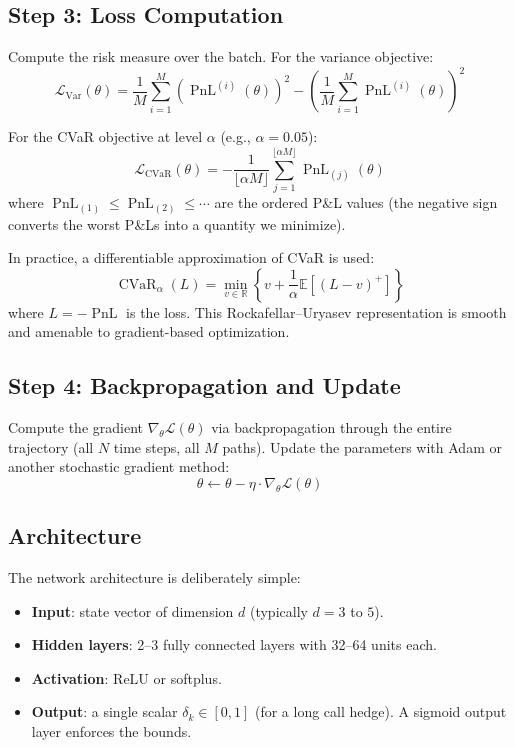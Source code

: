 \documentclass[11pt, a4paper]{article}
\theoremstyle{definition}
\theoremstyle{plain}
\theoremstyle{remark}
\newcommand{\CVaR}{\operatorname{CVaR}}
\newcommand{\EV}{\mathbb{E}}
\newcommand{\RV}{\mathbb{R}}
\newcommand{\PnL}{\operatorname{PnL}}
\begin{document}
\subsection{Step 3: Loss Computation}

Compute the risk measure over the batch.
For the variance objective:
\[
    \mathcal{L}_{\text{Var}}(\theta) = \frac{1}{M}\sum_{i=1}^{M}\left(\PnL^{(i)}(\theta)\right)^2
    - \left(\frac{1}{M}\sum_{i=1}^{M}\PnL^{(i)}(\theta)\right)^2
\]

For the CVaR objective at level $\alpha$ (e.g., $\alpha = 0.05$):
\[
    \mathcal{L}_{\CVaR}(\theta) = -\frac{1}{\lfloor \alpha M \rfloor}
    \sum_{j=1}^{\lfloor \alpha M \rfloor} \PnL_{(j)}(\theta)
\]
where $\PnL_{(1)} \leq \PnL_{(2)} \leq \cdots$ are the ordered P\&L values
(the negative sign converts the worst P\&Ls into a quantity we minimize).

In practice, a differentiable approximation of CVaR is used:
\[
    \CVaR_\alpha(L) = \min_{v \in \RV}\left\{v + \frac{1}{\alpha}\EV\!\left[(L - v)^+\right]\right\}
\]
where $L = -\PnL$ is the loss.
This Rockafellar--Uryasev representation is smooth and amenable to gradient-based optimization.

\subsection{Step 4: Backpropagation and Update}

Compute the gradient $\nabla_\theta \mathcal{L}(\theta)$ via backpropagation
through the entire trajectory (all $N$ time steps, all $M$ paths).
Update the parameters with Adam or another stochastic gradient method:
\[
    \theta \leftarrow \theta - \eta \cdot \nabla_\theta \mathcal{L}(\theta)
\]

\subsection{Architecture}

The network architecture is deliberately simple:
\begin{itemize}
    \item \textbf{Input}: state vector of dimension $d$ (typically $d = 3$ to $5$).
    \item \textbf{Hidden layers}: 2--3 fully connected layers with 32--64 units each.
    \item \textbf{Activation}: ReLU or softplus.
    \item \textbf{Output}: a single scalar $\delta_k \in [0, 1]$ (for a long call hedge).
          A sigmoid output layer enforces the bounds.
\end{itemize}
\end{document}
